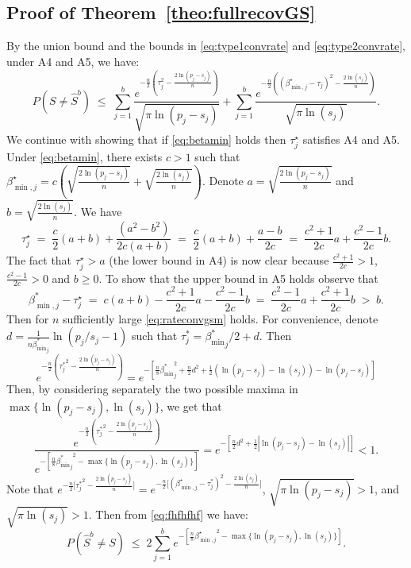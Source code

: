 \documentclass[aos]{imsart}
\theoremstyle{plain}
\begin{document}
\subsection{Proof of Theorem~\ref{theo:fullrecovGS}}
By the union bound and the bounds in \eqref{eq:type1convrate} and \eqref{eq:type2convrate}, under A4 and A5, we have:
\begin{equation}\label{eq:fhfhfhf}
P(S\neq \hat{S}^b) \; \leq\;\sum_{j=1}^b\frac{e^{-\tfrac{n}{2}\left(\tau_j^2-\tfrac{2\ln(p_j-s_j)}{n}\right)}}{\sqrt{\pi\ln(p_j-s_j)}}+\sum_{j=1}^b\frac{e^{-\tfrac{n}{2}\left((\beta^\star_{\min,j}-\tau_j)^2-\tfrac{2\ln(s_j)}{n}\right)}}{\sqrt{\pi\ln(s_j)}}.
\end{equation}
We continue with showing that if \eqref{eq:betamin} holds then $\tau^\star_j$ satisfies A4 and A5. Under \eqref{eq:betamin}, there exists $c>1$ such that $\beta^\star_{\min,j}=c(\sqrt{\tfrac{2\ln(p_j-s_j)}{n}} + \sqrt{\tfrac{2\ln(s_j)}{n}})$. Denote $a=\sqrt{\tfrac{2\ln(p_j-s_j)}{n}}$ and $b=\sqrt{\tfrac{2\ln(s_j)}{n}}$. We have
$$
\tau_j^\star\;=\;\frac{c}{2} (a+b)+\frac{(a^2-b^2)}{2c(a+b)}\;=\;\frac{c}{2} (a+b)+\frac{a-b}{2c}\;=\;\frac{c^2+1}{2c}a+\frac{c^2-1}{2c}b.
$$
The fact that $\tau^\star_j>a$ (the lower bound in A4) is now clear because $\tfrac{c^2+1}{2c}> 1$, $\tfrac{c^2-1}{2c}> 0$ and $b \geq 0$. To show that the upper bound in A5 holds observe that
$$
\beta_{\min,j}^* - \tau^\star_j \;=\; c(a+b)- \frac{c^2+1}{2c}a-\frac{c^2-1}{2c}b \;= \; \frac{c^2-1}{2c}a+\frac{c^2+1}{2c}b\;>\;  b.
$$
Then for $n$ sufficiently large \eqref{eq:rateconvgsm} holds. For convenience, denote $d = \frac{1}{n {\beta_{\min}^*}_j} \ln (p_j / s_j-1)$ such that $\tau^*_j= {\beta_{\min}^*}_j/2 + d$. Then
$$e^{-\frac{n}{2}\left({\tau^*_j}^2-\frac{2\ln(p_j-s_j)}{n}\right)}
=e^{-\left[\frac{n}{8}{\beta_{\min}^*}_j^2+\frac{n}{2}d^2 + \frac{1}{2}\left(\ln (p_j- s_j)-\ln (s_j)\right) -\ln (p_j- s_j)\right]}$$
Then, by considering separately the two possible maxima in $\max\{\ln(p_j-s_j),\ln(s_j)\}$, we get that
$$\frac{e^{-\frac{n}{2}\left({\tau^*_j}^2-\frac{2\ln(p_j-s_j)}{n}\right)}}{e^{-[\frac{n}{8}{{\beta_{\min}^*}_j}^2-\max\{\ln(p_j-s_j),\ln(s_j)\}]}}= 
e^{-\left[\frac{n}{2}d^2 + \frac{1}{2}\left|\ln (p_j- s_j)-\ln (s_j)\right|\right]} <1.$$
Note that $e^{-\tfrac{n}{2}\big[{\tau_j^*}^2-\tfrac{2\ln(p_j-s_j)}{n}\big]}=e^{-\tfrac{n}{2}\big[(\beta^\star_{\min,j}-{\tau_j^*})^2-\tfrac{2\ln(s_j)}{n}\big]}$,  $\sqrt{\pi\ln(p_j-s_j)}>1$, and $\sqrt{\pi\ln(s_j)}>1$. Then from \eqref{eq:fhfhfhf} we have:
$$P(\hat{S}^{b} \neq S) \; \leq \; 2 \sum_{j=1}^be^{-[\frac{n}{8}{\beta^\star_{\min,j}}^2-\max\{\ln(p_j-s_j),\ln(s_j)\}]}.$$
\end{document}
